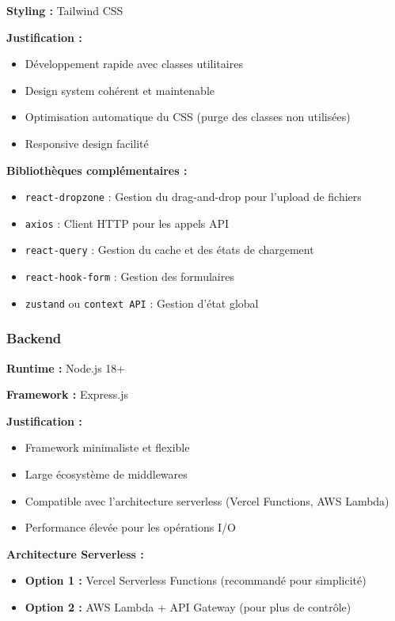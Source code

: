 \documentclass[12pt,a4paper]{article}
\begin{document}
\textbf{Styling :} Tailwind CSS

\textbf{Justification :}
\begin{itemize}[leftmargin=*]
    \item Développement rapide avec classes utilitaires
    \item Design system cohérent et maintenable
    \item Optimisation automatique du CSS (purge des classes non utilisées)
    \item Responsive design facilité
\end{itemize}

\textbf{Bibliothèques complémentaires :}
\begin{itemize}[leftmargin=*]
    \item \texttt{react-dropzone} : Gestion du drag-and-drop pour l'upload de fichiers
    \item \texttt{axios} : Client HTTP pour les appels API
    \item \texttt{react-query} : Gestion du cache et des états de chargement
    \item \texttt{react-hook-form} : Gestion des formulaires
    \item \texttt{zustand} ou \texttt{context API} : Gestion d'état global
\end{itemize}

\subsubsection{Backend}

\textbf{Runtime :} Node.js 18+

\textbf{Framework :} Express.js

\textbf{Justification :}
\begin{itemize}[leftmargin=*]
    \item Framework minimaliste et flexible
    \item Large écosystème de middlewares
    \item Compatible avec l'architecture serverless (Vercel Functions, AWS Lambda)
    \item Performance élevée pour les opérations I/O
\end{itemize}

\textbf{Architecture Serverless :}
\begin{itemize}[leftmargin=*]
    \item \textbf{Option 1 :} Vercel Serverless Functions (recommandé pour simplicité)
    \item \textbf{Option 2 :} AWS Lambda + API Gateway (pour plus de contrôle)
\end{itemize}
\end{document}
